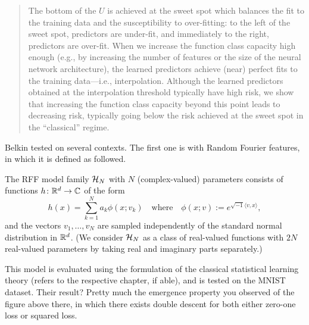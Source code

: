 \blockquote[\cite{belkin_reconciling_2019}]{The bottom of the $U$ is achieved at the sweet spot which balances the fit to the training data and the susceptibility to over-fitting:
to the left of the sweet spot, predictors are under-fit, and immediately to the right, predictors are over-fit.
When we increase the function class capacity high enough (e.g., by increasing the number of features or the size of the neural network architecture), the learned predictors achieve (near) perfect fits to the training data---i.e., interpolation.
Although the learned predictors obtained at the interpolation threshold typically have high risk, we show that increasing the function class capacity beyond this point leads to decreasing risk, typically going below the risk achieved at the sweet spot in the ``classical'' regime.}

Belkin tested on several contexts. The first one is with Random Fourier features, in which it is defined as followed. 

\begin{definition}
    The RFF model family ${\mathcal{H}_N}$ with $N$ (complex-valued) parameters consists of functions $h \colon \mathbb{R}^d \to \mathbb{C}$ of the form
\[
  h(x) = \sum_{k=1}^N a_k \phi(x; v_k)
  \quad\text{where}\quad
  \phi(x; v) := e^{\sqrt{-1} \langle v,x \rangle} ,
\]
and the vectors $v_1,\dotsc,v_N$ are sampled independently of the standard normal distribution in $\mathbb{R}^d$.
(We consider ${\mathcal{H}_N}$ as a class of real-valued functions with $2N$ real-valued parameters by taking real and imaginary parts separately.)
\end{definition}

This model is evaluated using the formulation of the classical statistical learning theory (refers to the respective chapter, if able), and is tested on the MNIST dataset. Their result? Pretty much the emergence property you observed of the figure above there, in which there exists double descent for both either zero-one loss or squared loss. 

